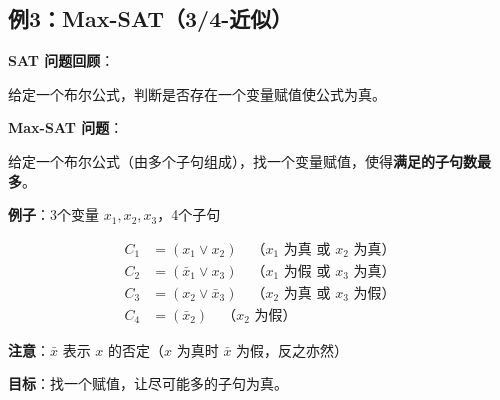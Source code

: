 \documentclass[12pt, a4paper]{ctexart}
\begin{document}
\subsection{例3：Max-SAT（3/4-近似）}

\begin{blackboard}

\textbf{SAT 问题回顾}：

给定一个布尔公式，判断是否存在一个变量赋值使公式为真。

\textbf{Max-SAT 问题}：

给定一个布尔公式（由多个子句组成），找一个变量赋值，使得\textbf{满足的子句数最多}。

\textbf{例子}：3个变量 $x_1, x_2, x_3$，4个子句

\begin{align*}
C_1 &= (x_1 \vee x_2) \quad \text{（$x_1$ 为真 或 $x_2$ 为真）} \\
C_2 &= (\bar{x}_1 \vee x_3) \quad \text{（$x_1$ 为假 或 $x_3$ 为真）} \\
C_3 &= (x_2 \vee \bar{x}_3) \quad \text{（$x_2$ 为真 或 $x_3$ 为假）} \\
C_4 &= (\bar{x}_2) \quad \text{（$x_2$ 为假）}
\end{align*}

\textbf{注意}：$\bar{x}$ 表示 $x$ 的否定（$x$ 为真时 $\bar{x}$ 为假，反之亦然）

\textbf{目标}：找一个赋值，让尽可能多的子句为真。

\end{blackboard}
\end{document}
